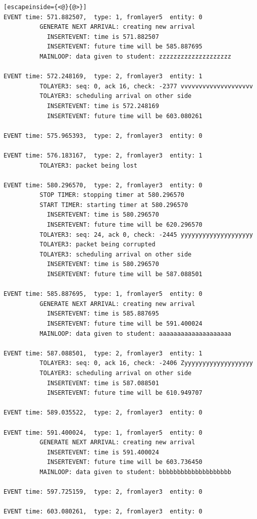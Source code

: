 \documentclass[paper=a4, fontsize=11pt]{scrartcl}
\numberwithin{equation}{section}		%
\numberwithin{figure}{section}			%
\numberwithin{table}{section}				%
\begin{document}
\begin{lstlisting}[escapeinside={<@}{@>}]
EVENT time: 571.882507,  type: 1, fromlayer5  entity: 0
          GENERATE NEXT ARRIVAL: creating new arrival
            INSERTEVENT: time is 571.882507
            INSERTEVENT: future time will be 585.887695
          MAINLOOP: data given to student: zzzzzzzzzzzzzzzzzzzz

EVENT time: 572.248169,  type: 2, fromlayer3  entity: 1
          TOLAYER3: seq: 0, ack 16, check: -2377 vvvvvvvvvvvvvvvvvvvv
          TOLAYER3: scheduling arrival on other side
            INSERTEVENT: time is 572.248169
            INSERTEVENT: future time will be 603.080261

EVENT time: 575.965393,  type: 2, fromlayer3  entity: 0

EVENT time: 576.183167,  type: 2, fromlayer3  entity: 1
          TOLAYER3: packet being lost

EVENT time: 580.296570,  type: 2, fromlayer3  entity: 0
          STOP TIMER: stopping timer at 580.296570
          START TIMER: starting timer at 580.296570
            INSERTEVENT: time is 580.296570
            INSERTEVENT: future time will be 620.296570
          TOLAYER3: seq: 24, ack 0, check: -2445 yyyyyyyyyyyyyyyyyyyy
          TOLAYER3: packet being corrupted
          TOLAYER3: scheduling arrival on other side
            INSERTEVENT: time is 580.296570
            INSERTEVENT: future time will be 587.088501

EVENT time: 585.887695,  type: 1, fromlayer5  entity: 0
          GENERATE NEXT ARRIVAL: creating new arrival
            INSERTEVENT: time is 585.887695
            INSERTEVENT: future time will be 591.400024
          MAINLOOP: data given to student: aaaaaaaaaaaaaaaaaaaa

EVENT time: 587.088501,  type: 2, fromlayer3  entity: 1
          TOLAYER3: seq: 0, ack 16, check: -2406 Zyyyyyyyyyyyyyyyyyyy
          TOLAYER3: scheduling arrival on other side
            INSERTEVENT: time is 587.088501
            INSERTEVENT: future time will be 610.949707

EVENT time: 589.035522,  type: 2, fromlayer3  entity: 0

EVENT time: 591.400024,  type: 1, fromlayer5  entity: 0
          GENERATE NEXT ARRIVAL: creating new arrival
            INSERTEVENT: time is 591.400024
            INSERTEVENT: future time will be 603.736450
          MAINLOOP: data given to student: bbbbbbbbbbbbbbbbbbbb

EVENT time: 597.725159,  type: 2, fromlayer3  entity: 0

EVENT time: 603.080261,  type: 2, fromlayer3  entity: 0


\end{lstlisting}
\end{document}
